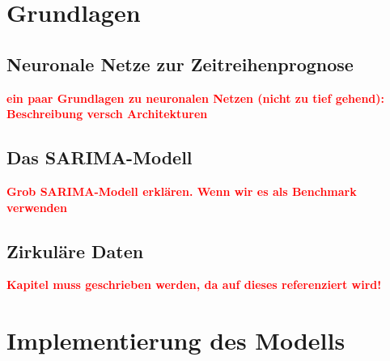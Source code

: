 \documentclass[
12pt, %
toc=listofnumbered, %
toc=chapterentrydotfill, %
numbers=noenddot, %
captions=tableheading, %
bibliography=numbered
]{scrreprt}
\let\Oldsection\section
\renewcommand{\section}{\FloatBarrier\Oldsection}
\newcommand{\highlight}[1]{\textbf{\textcolor{red}{#1}}}
\begin{document}
\chapter{Grundlagen}

\section{Neuronale Netze zur Zeitreihenprognose}
\highlight{ein paar Grundlagen zu neuronalen Netzen (nicht zu tief gehend): 
Beschreibung versch Architekturen}

\section{Das SARIMA-Modell}
\highlight{Grob SARIMA-Modell erklären. Wenn wir es als Benchmark verwenden}

\section{Zirkuläre Daten}\label{section:circ_data}
\highlight{Kapitel muss geschrieben werden, da auf dieses referenziert wird!}

\chapter{Implementierung des Modells}
\end{document}
